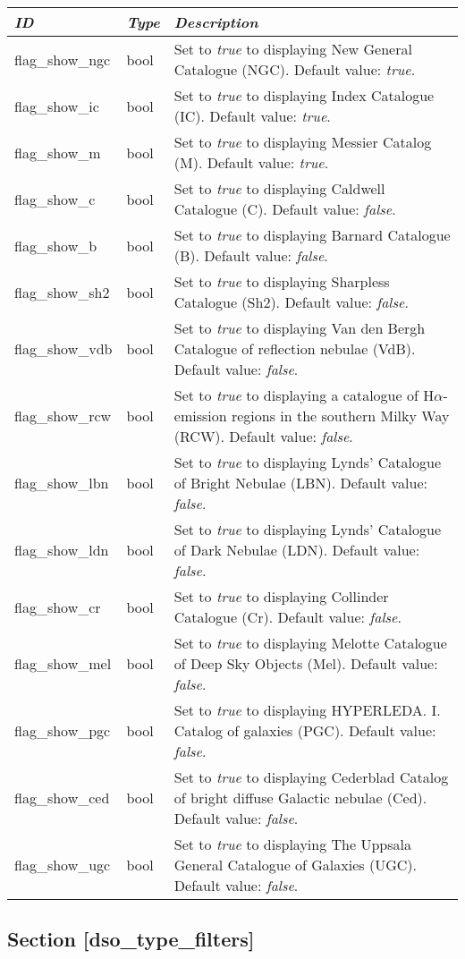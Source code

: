 \begin{longtabu} to \textwidth {l|l|X}
\toprule
\emph{ID} & \emph{Type} & \emph{Description}\tabularnewline
\midrule
flag\_show\_ngc & bool & Set to \emph{true} to displaying New General Catalogue (NGC). Default value: \emph{true}. \tabularnewline
\midrule
flag\_show\_ic & bool & Set to \emph{true} to
displaying Index Catalogue (IC). Default value: \emph{true}. \tabularnewline
\midrule
flag\_show\_m & bool & Set to \emph{true} to displaying Messier Catalog (M). Default value: \emph{true}. \tabularnewline
\midrule
flag\_show\_c & bool & Set to \emph{true} to displaying Caldwell Catalogue (C). Default value: \emph{false}. \tabularnewline
\midrule
flag\_show\_b & bool & Set to \emph{true} to displaying Barnard Catalogue (B). Default value: \emph{false}. \tabularnewline
\midrule
flag\_show\_sh2 & bool & Set to \emph{true} to displaying Sharpless Catalogue (Sh2). Default value: \emph{false}. \tabularnewline
\midrule
flag\_show\_vdb & bool & Set to \emph{true} to displaying Van den Bergh Catalogue of reflection nebulae (VdB). Default value: \emph{false}. \tabularnewline
\midrule
flag\_show\_rcw & bool & Set to \emph{true} to displaying a catalogue of H$\alpha$-emission regions in the southern Milky Way (RCW). Default value: \emph{false}. \tabularnewline
\midrule
flag\_show\_lbn & bool & Set to \emph{true} to displaying Lynds' Catalogue of Bright Nebulae (LBN). Default value: \emph{false}. \tabularnewline
\midrule
flag\_show\_ldn & bool & Set to \emph{true} to displaying Lynds' Catalogue of Dark Nebulae (LDN). Default value: \emph{false}. \tabularnewline
\midrule
flag\_show\_cr & bool & Set to \emph{true} to displaying Collinder Catalogue (Cr). Default value: \emph{false}. \tabularnewline
\midrule
flag\_show\_mel & bool & Set to \emph{true} to displaying Melotte Catalogue of Deep Sky Objects (Mel). Default value: \emph{false}. \tabularnewline
\midrule
flag\_show\_pgc & bool & Set to \emph{true} to displaying HYPERLEDA. I. Catalog of galaxies (PGC). Default value: \emph{false}. \tabularnewline
\midrule
flag\_show\_ced & bool & Set to \emph{true} to displaying Cederblad Catalog of bright diffuse Galactic nebulae (Ced). Default value: \emph{false}. \tabularnewline
\midrule
flag\_show\_ugc & bool & Set to \emph{true} to displaying The Uppsala General Catalogue of Galaxies (UGC). Default value: \emph{false}. \tabularnewline
\bottomrule
\end{longtabu}

\subsection{Section
{[}dso\_type\_filters{]}}\label{section-dsoux5ftypeux5ffilters}

